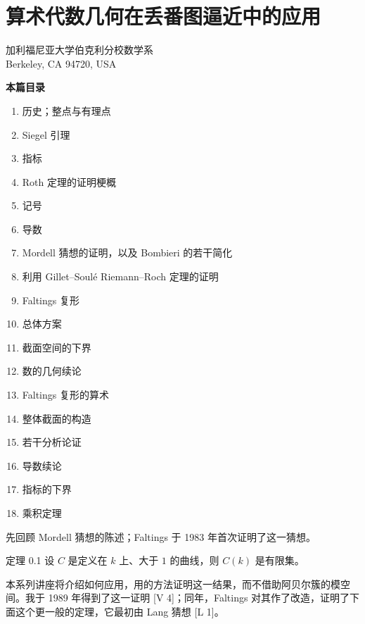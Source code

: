 \chapter{算术代数几何在丢番图逼近中的应用}
\begingroup
\renewcommand{\thefootnote}{\fnsymbol{footnote}}
\endgroup
{}
\begin{center}
加利福尼亚大学伯克利分校数学系\\
Berkeley, CA 94720, USA
\end{center}

\noindent\textbf{本篇目录}
\begin{enumerate}[label=\arabic*.,nosep]
\item 历史；整点与有理点
\item Siegel 引理
\item 指标
\item Roth 定理的证明梗概
\item 记号
\item 导数
\item Mordell 猜想的证明，以及 Bombieri 的若干简化
\item 利用 Gillet--Soulé Riemann--Roch 定理的证明
\item Faltings 复形
\item 总体方案
\item 截面空间的下界
\item 数的几何续论
\item Faltings 复形的算术
\item 整体截面的构造
\item 若干分析论证
\item 导数续论
\item 指标的下界
\item 乘积定理
\end{enumerate}

先回顾 Mordell 猜想的陈述；Faltings 于 1983 年首次证明了这一猜想。
\begin{statement}{定理 0.1}
设 $C$ 是定义在 $k$ 上、大于 $1$ 的曲线，则 $C(k)$ 是有限集。
\end{statement}
本系列讲座将介绍如何应用，用的方法证明这一结果，而不借助阿贝尔簇的模空间。我于 1989 年得到了这一证明 [V 4]；同年，Faltings 对其作了改造，证明了下面这个更一般的定理，它最初由 Lang 猜想 [L 1]。

